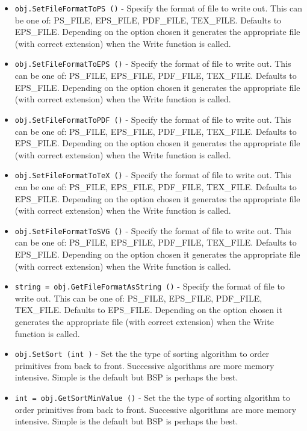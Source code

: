 \begin{itemize}
\item  \verb|obj.SetFileFormatToPS ()| -  Specify the format of file to write out.  This can be one of:
 PS\_FILE, EPS\_FILE, PDF\_FILE, TEX\_FILE.  Defaults to EPS\_FILE.
 Depending on the option chosen it generates the appropriate file
 (with correct extension) when the Write function is called.

\item  \verb|obj.SetFileFormatToEPS ()| -  Specify the format of file to write out.  This can be one of:
 PS\_FILE, EPS\_FILE, PDF\_FILE, TEX\_FILE.  Defaults to EPS\_FILE.
 Depending on the option chosen it generates the appropriate file
 (with correct extension) when the Write function is called.

\item  \verb|obj.SetFileFormatToPDF ()| -  Specify the format of file to write out.  This can be one of:
 PS\_FILE, EPS\_FILE, PDF\_FILE, TEX\_FILE.  Defaults to EPS\_FILE.
 Depending on the option chosen it generates the appropriate file
 (with correct extension) when the Write function is called.

\item  \verb|obj.SetFileFormatToTeX ()| -  Specify the format of file to write out.  This can be one of:
 PS\_FILE, EPS\_FILE, PDF\_FILE, TEX\_FILE.  Defaults to EPS\_FILE.
 Depending on the option chosen it generates the appropriate file
 (with correct extension) when the Write function is called.

\item  \verb|obj.SetFileFormatToSVG ()| -  Specify the format of file to write out.  This can be one of:
 PS\_FILE, EPS\_FILE, PDF\_FILE, TEX\_FILE.  Defaults to EPS\_FILE.
 Depending on the option chosen it generates the appropriate file
 (with correct extension) when the Write function is called.

\item  \verb|string = obj.GetFileFormatAsString ()| -  Specify the format of file to write out.  This can be one of:
 PS\_FILE, EPS\_FILE, PDF\_FILE, TEX\_FILE.  Defaults to EPS\_FILE.
 Depending on the option chosen it generates the appropriate file
 (with correct extension) when the Write function is called.

\item  \verb|obj.SetSort (int )| -  Set the the type of sorting algorithm to order primitives from
 back to front.  Successive algorithms are more memory
 intensive.  Simple is the default but BSP is perhaps the best.

\item  \verb|int = obj.GetSortMinValue ()| -  Set the the type of sorting algorithm to order primitives from
 back to front.  Successive algorithms are more memory
 intensive.  Simple is the default but BSP is perhaps the best.


\end{itemize}
